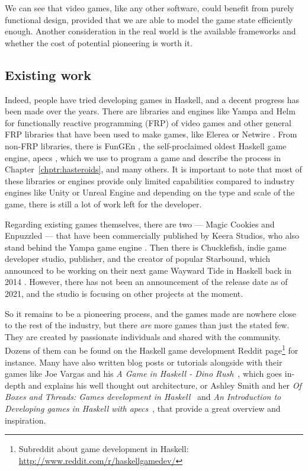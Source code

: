 \documentclass[
  digital, %
  color,   %
  table,   %
  oneside, %
  lof,     %
  lot,     %
]{fithesis3}
\begin{document}
We can see that video games, like any other software, could benefit from
purely functional design, provided that we are able to model the
game state efficiently enough. Another consideration in the real world
is the available frameworks and whether the cost of potential
pioneering is worth it.


\subsection{Existing work}
\label{sect:existing}
Indeed, people have tried developing games in Haskell, and a decent
progress has been made over the years. There are libraries and engines like Yampa \cite{yamparepo}
and Helm \cite{helmrepo} for functionally reactive programming (FRP) of video games and
other general FRP libraries that have been used to make games, like Elerea \cite{elerearepo}
or Netwire \cite{netwirerepo}. From non-FRP libraries, there is
FunGEn \cite{fungenrepo}, the self-proclaimed oldest Haskell game engine,
apecs \cite{apecsrepo}, which we use to program a game and describe the process
in Chapter~\ref{chptr:hasteroids}, and many others. It is important to note that
most of these libraries or engines provide only limited capabilities
compared to  industry engines like Unity or Unreal Engine
and depending on the type and scale of the game, there is still a lot
of work left for the developer.

Regarding existing games themselves, there are two --- Magic Cookies and
Enpuzzled --- that have been commercially published by Keera Studios,
who also stand behind the Yampa game engine \cite{keerastudios}.
Then there is Chucklefish, indie game developer studio, publisher, and
the creator of popular Starbound, which announced to be working on their next
game Wayward Tide in Haskell back in 2014 \cite{waywardtide}. However, there
has not been an announcement of the release date as of 2021, and the studio is
focusing on other projects at the moment.

So it remains to be a pioneering process, and the games made are nowhere close
to the rest of the industry, but there \emph{are} more games than just the stated few.
They are created by passionate individuals and shared with the community. Dozens of them can be found
on the Haskell game development Reddit page\footnote{
Subreddit about game development in Haskell: \url{http://www.reddit.com/r/haskellgamedev/}
}
for instance. Many have also written blog posts or tutorials alongside with
their games like Joe Vargas and his \textit{A Game in Haskell - Dino Rush}~\cite{dinorush},
which goes in-depth and explains his well thought out architecture,
or Ashley Smith and her \textit{Of Boxes and Threads: Games development in Haskell}~\cite{aashaskell}
and \textit{An Introduction to Developing games in Haskell with apecs}~\cite{aasapecs},
that provide a great overview and inspiration.
\end{document}
